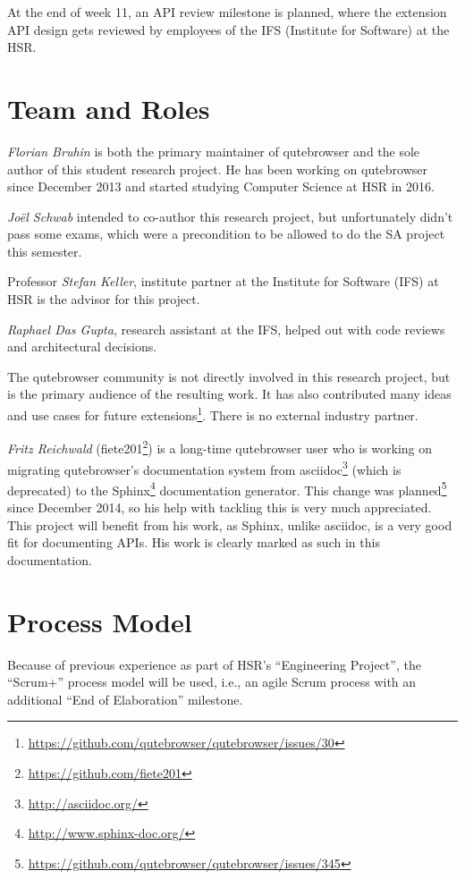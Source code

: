 \documentclass[a4paper,parskip=full]{scrreprt}
\begin{document}
At the end of week 11, an API review milestone is planned, where the extension
API design gets reviewed by employees of the IFS (Institute for Software) at the
HSR.

\section{Team and Roles}
\emph{Florian Bruhin} is both the primary maintainer of qutebrowser and the
sole author of this student research project. He has been working on qutebrowser since
December 2013 and started studying Computer Science at HSR in 2016.

\emph{Joël Schwab} intended to co-author this research project, but
unfortunately didn't pass some exams, which were a precondition to be allowed to
do the SA project this semester.

Professor \emph{Stefan Keller}, institute partner at the Institute for Software
(IFS) at HSR is the advisor for this project.

\emph{Raphael Das Gupta}, research assistant at the IFS, helped out with code
reviews and architectural decisions.

The qutebrowser community is not directly involved in this research project, but
is the primary audience of the resulting work. It has also contributed many
ideas and use cases for future
extensions\footnote{\url{https://github.com/qutebrowser/qutebrowser/issues/30}}.
There is no external industry partner.

\label{fiete}
\emph{Fritz Reichwald} (fiete201\footnote{\url{https://github.com/fiete201}})
is a long-time qutebrowser user who is working on migrating qutebrowser's
documentation system from asciidoc\footnote{\url{http://asciidoc.org/}} (which
is deprecated) to the Sphinx\footnote{\url{http://www.sphinx-doc.org/}}
documentation generator. This change was
planned\footnote{\url{https://github.com/qutebrowser/qutebrowser/issues/345}}
since December 2014, so his help with tackling this is very much appreciated.
This project will benefit from his work, as Sphinx, unlike asciidoc, is a
very good fit for documenting APIs. His work is clearly marked as such in this
documentation.

\section{Process Model}
Because of previous experience as part of HSR's ``Engineering Project'', the
``Scrum+'' process model will be used, i.e., an agile Scrum process with an
additional ``End of Elaboration'' milestone.
\end{document}
